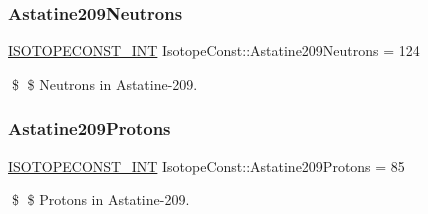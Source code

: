 \subsubsection{\texorpdfstring{Astatine209\+Neutrons}{Astatine209Neutrons}}
{\footnotesize\ttfamily \mbox{\hyperlink{group___isotope_const-_macros_ga5f18360b3e99483a35c32d789e62621c}{I\+S\+O\+T\+O\+P\+E\+C\+O\+N\+S\+T\+\_\+\+I\+NT}} Isotope\+Const\+::\+Astatine209\+Neutrons = 124}

\$ \$ Neutrons in Astatine-\/209. \mbox{\label{group___isotope_const-_astatine-_at209_gaaf62ead8aaf2b01b00becafc1467e1b4}} 
\subsubsection{\texorpdfstring{Astatine209\+Protons}{Astatine209Protons}}
{\footnotesize\ttfamily \mbox{\hyperlink{group___isotope_const-_macros_ga5f18360b3e99483a35c32d789e62621c}{I\+S\+O\+T\+O\+P\+E\+C\+O\+N\+S\+T\+\_\+\+I\+NT}} Isotope\+Const\+::\+Astatine209\+Protons = 85}

\$ \$ Protons in Astatine-\/209. 